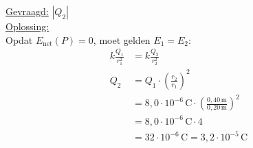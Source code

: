 \documentclass{ximera}
\begin{document}
\begin{exercise}
\begin{question}
\begin{solution}
            \underline{Gevraagd:} $|Q_2|$\\

            \underline{Oplossing:}\\
            Opdat $E_{\text{net}}(P) = 0$, moet gelden $E_1 = E_2$:
            \begin{align*}
                k \frac{Q_1}{r_1^{2}} &= k \frac{Q_2}{r_2^{2}} \\
                Q_2 &= Q_1 \cdot \left(\frac{r_2}{r_1}\right)^{2} \\
                    &= 8{,}0 \cdot 10^{-6} \, \mathrm{C} \cdot \left(\frac{0{,}40 \, \mathrm{m}}{0{,}20 \, \mathrm{m}}\right)^{2} \\
                    &= 8{,}0 \cdot 10^{-6} \, \mathrm{C} \cdot 4 \\
                    &= 32 \cdot 10^{-6} \, \mathrm{C} = \boxed{3{,}2 \cdot 10^{-5} \, \mathrm{C}}
            \end{align*}
        \end{solution}
    \end{question}
\end{exercise}
\end{document}
